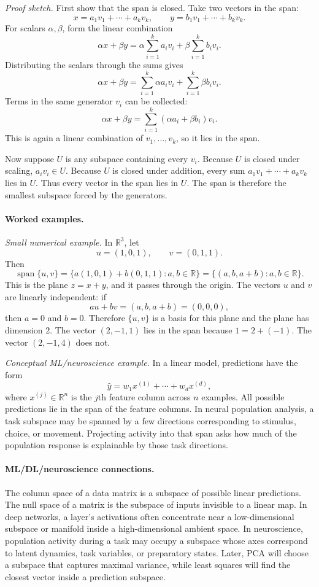 \emph{Proof sketch.} First show that the span is closed. Take two vectors in the span:
\[
x=a_1v_1+\cdots+a_kv_k,
\qquad
y=b_1v_1+\cdots+b_kv_k.
\]
For scalars \(\alpha,\beta\), form the linear combination
\[
\alpha x+\beta y
=\alpha\sum_{i=1}^k a_i v_i+\beta\sum_{i=1}^k b_i v_i.
\]
Distributing the scalars through the sums gives
\[
\alpha x+\beta y
=\sum_{i=1}^k \alpha a_i v_i+\sum_{i=1}^k \beta b_i v_i.
\]
Terms in the same generator \(v_i\) can be collected:
\[
\alpha x+\beta y
=\sum_{i=1}^k (\alpha a_i+\beta b_i)v_i.
\]
This is again a linear combination of \(v_1,\dots,v_k\), so it lies in the span.

Now suppose \(U\) is any subspace containing every \(v_i\). Because \(U\) is closed under scaling, \(a_i v_i\in U\). Because \(U\) is closed under addition, every sum \(a_1v_1+\cdots+a_kv_k\) lies in \(U\). Thus every vector in the span lies in \(U\). The span is therefore the smallest subspace forced by the generators.

\paragraph{Worked examples.}
\emph{Small numerical example.} In \(\mathbb{R}^3\), let
\[
u=(1,0,1),\qquad v=(0,1,1).
\]
Then
\[
\operatorname{span}\{u,v\}
=\{a(1,0,1)+b(0,1,1):a,b\in\mathbb{R}\}
=\{(a,b,a+b):a,b\in\mathbb{R}\}.
\]
This is the plane \(z=x+y\), and it passes through the origin. The vectors \(u\) and \(v\) are linearly independent: if
\[
au+bv=(a,b,a+b)=(0,0,0),
\]
then \(a=0\) and \(b=0\). Therefore \(\{u,v\}\) is a basis for this plane and the plane has dimension \(2\). The vector \((2,-1,1)\) lies in the span because \(1=2+(-1)\). The vector \((2,-1,4)\) does not.

\emph{Conceptual ML/neuroscience example.} In a linear model, predictions have the form
\[
\hat y=w_1x^{(1)}+\cdots+w_dx^{(d)},
\]
where \(x^{(j)}\in\mathbb{R}^n\) is the \(j\)th feature column across \(n\) examples. All possible predictions lie in the span of the feature columns. In neural population analysis, a task subspace may be spanned by a few directions corresponding to stimulus, choice, or movement. Projecting activity into that span asks how much of the population response is explainable by those task directions.

\paragraph{ML/DL/neuroscience connections.}
The column space of a data matrix is a subspace of possible linear predictions. The null space of a matrix is the subspace of inputs invisible to a linear map. In deep networks, a layer's activations often concentrate near a low-dimensional subspace or manifold inside a high-dimensional ambient space. In neuroscience, population activity during a task may occupy a subspace whose axes correspond to latent dynamics, task variables, or preparatory states. Later, PCA will choose a subspace that captures maximal variance, while least squares will find the closest vector inside a prediction subspace.

